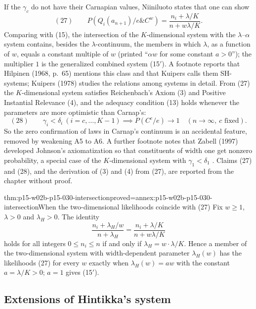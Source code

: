 If the \(\gamma_c\) do not have their Carnapian values, Niiniluoto states
that one can show
\[
 (27)\qquad P(Q_i(a_{n+1})/e\&C^w)=\frac{n_i+\lambda/K}{n+w\lambda/K}.
\]
Comparing with (15), the intersection of the \(K\)-dimensional system
with the \(\lambda\)--\(\alpha\) system contains, besides the
\(\lambda\)-continuum, the members in which \(\lambda\), as a function of
\(w\), equals a constant multiple of \(w\) (printed ``\(\alpha w\) for some
constant \(a>0\)''); the multiplier \(1\) is the generalized combined
system (15\('\)). A footnote reports that Hilpinen (1968, p.~65) mentions
this class and that Kuipers calls them SH-systems; Kuipers (1978) studies
the relations among systems in detail. From (27) the \(K\)-dimensional
system satisfies Reichenbach's Axiom (3) and Positive Instantial
Relevance (4), and the adequacy condition (13) holds whenever the
parameters are more optimistic than Carnap's:
\[
 (28)\qquad \gamma_i<\delta_i\ (i=c,\ldots,K-1)\implies P(C^c/e)\to1
 \quad(n\to\infty,\ c\text{ fixed}).
\]
So the zero confirmation of laws in Carnap's continuum is an accidental
feature, removed by weakening A5 to A6. A further footnote notes that
Zabell (1997) developed Johnson's axiomatization so that constituents of
width one get nonzero probability, a special case of the
\(K\)-dimensional system with \(\gamma_1<\delta_1\)
\cite[p.~325 and nn.~3--4]{Niiniluoto2011HintikkaProgramReading}. Claims
(27) and (28), and the derivation of (3) and (4) from (27), are reported
from the chapter without proof.

\begin{hbtheorem}{thm:p15-w02b-p15-030-intersection}{proved=annex:p15-w02b-p15-030-intersection}{When the two-dimensional likelihoods coincide with (27)}
Fix \(w\geq1\), \(\lambda>0\) and \(\lambda_H>0\). The identity
\[
 \frac{n_i+\lambda_H/w}{n+\lambda_H}=\frac{n_i+\lambda/K}{n+w\lambda/K}
\]
holds for all integers \(0\leq n_i\leq n\) if and only if
\(\lambda_H=w\cdot\lambda/K\). Hence a member of the two-dimensional system
with width-dependent parameter \(\lambda_H(w)\) has the likelihoods (27)
for every \(w\) exactly when \(\lambda_H(w)=aw\) with the constant
\(a=\lambda/K>0\); \(a=1\) gives (15\('\)).
\end{hbtheorem}

\subsection{Extensions of Hintikka's system}
\label{sec:p15-w02b-p15-030-nn-extensions}

